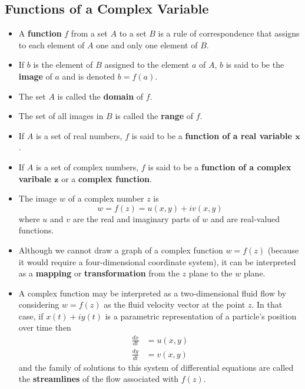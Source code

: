 \documentclass{article}
\begin{document}
\subsection{Functions of a Complex Variable}

\begin{itemize}
  \item A \textbf{function} $f$ from a set $A$ to a set $B$ is a rule of correspondence that assigns to each element of $A$ one and only one element of $B$.

  \item If $b$ is the element of $B$ assigned to the element $a$ of $A$, $b$ is said to be the \textbf{image} of $a$ and is denoted $b = f(a)$.

  \item The set $A$ is called the \textbf{domain} of $f$.

  \item The set of all images in $B$ is called the \textbf{range} of $f$.

  \item If $A$ is a set of real numbers, $f$ is said to be a \textbf{function of a real variable $\boldsymbol{x}$}.

  \item If $A$ is a set of complex numbers, $f$ is said to be a \textbf{function of a complex varibale $\boldsymbol{z}$} or a \textbf{complex function}.

  \item The image $w$ of a complex number $z$ is \[w = f(z) = u(x, y) + i v(x, y)\] where $u$ and $v$ are the real and imaginary parts of $w$ and are real-valued functions.

  \item Although we cannot draw a graph of a complex function $w = f(z)$ (because it would require a four-dimensional coordinate system), it can be interpreted as a \textbf{mapping} or \textbf{transformation} from the $z$ plane to the $w$ plane.

  \item A complex function may be interpreted as a two-dimensional fluid flow by considering $w = f(z)$ as the fluid velocity vector at the point $z$. In that case, if $x(t) + i y(t)$ is a parametric representation of a particle's position over time then \begin{align*}
          \frac{d x}{d t} & = u(x, y) \\
          \frac{d y}{d t} & = v(x, y)
        \end{align*} and the family of solutions to this system of differential equations are called the \textbf{streamlines} of the flow associated with $f(z)$.
\end{itemize}
\end{document}
